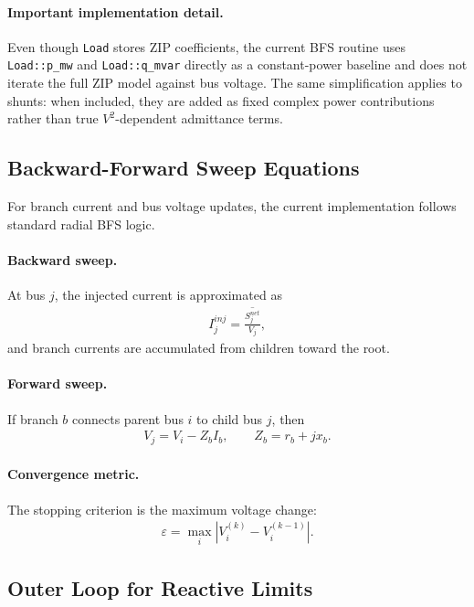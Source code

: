 \paragraph{Important implementation detail.}
Even though \texttt{Load} stores ZIP coefficients, the current BFS routine uses
\texttt{Load::p\_mw} and \texttt{Load::q\_mvar} directly as a constant-power
baseline and does not iterate the full ZIP model against bus voltage.  The same
simplification applies to shunts: when included, they are added as fixed complex
power contributions rather than true \(V^2\)-dependent admittance terms.

\subsection{Backward-Forward Sweep Equations}

For branch current and bus voltage updates, the current implementation follows
standard radial BFS logic.

\paragraph{Backward sweep.}
At bus \(j\), the injected current is approximated as
\begin{align}
I_j^{inj} = \overline{\frac{S_j^{net}}{V_j}},
\end{align}
and branch currents are accumulated from children toward the root.

\paragraph{Forward sweep.}
If branch \(b\) connects parent bus \(i\) to child bus \(j\), then
\begin{align}
V_j = V_i - Z_b I_b,
\qquad Z_b = r_b + jx_b.
\end{align}

\paragraph{Convergence metric.}
The stopping criterion is the maximum voltage change:
\begin{align}
\varepsilon = \max_i |V_i^{(k)} - V_i^{(k-1)}|.
\end{align}

\subsection{Outer Loop for Reactive Limits}

